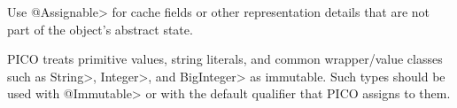Use \<@Assignable> for cache fields or other representation details that
are not part of the object's abstract state.


PICO treats primitive values, string literals, and common wrapper/value
classes such as \<String>, \<Integer>, and \<BigInteger> as immutable.
Such types should be used with \<@Immutable> or with the default qualifier
that PICO assigns to them.
